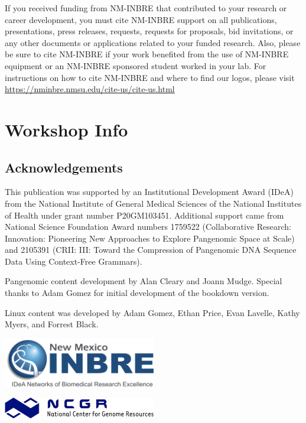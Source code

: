 \documentclass[
]{book}
\begin{document}
If you received funding from NM-INBRE that contributed to your research or career development, you must cite NM-INBRE support on all publications, presentations, press releases, requests, requests for proposals, bid invitations, or any other documents or applications related to your funded research. Also, please be sure to cite NM-INBRE if your work benefited from the use of NM-INBRE equipment or an NM-INBRE sponsored student worked in your lab.
For instructions on how to cite NM-INBRE and where to find our logos, please visit \url{https://nminbre.nmsu.edu/cite-us/cite-us.html}

\hypertarget{workshop-info}{%
\chapter{Workshop Info}\label{workshop-info}}

\hypertarget{acknowledgements}{%
\section{Acknowledgements}\label{acknowledgements}}

This publication was supported by an Institutional Development Award (IDeA) from the National Institute of General Medical Sciences of the National Institutes of Health under grant number P20GM103451. Additional support came from National Science Foundation Award numbers 1759522 (Collaborative Research: Innovation: Pioneering New Approaches to Explore Pangenomic Space at Scale) and 2105391 (CRII: III: Toward the Compression of Pangenomic DNA Sequence Data Using Context-Free Grammars).

Pangenomic content development by Alan Cleary and Joann Mudge. Special thanks to Adam Gomez for initial development of the bookdown version.

Linux content was developed by Adam Gomez, Ethan Price, Evan Lavelle, Kathy Myers, and Forrest Black.

\includegraphics[width=0.5\textwidth,height=\textheight]{./Figures/INBRE_Logo_Grad_transparent-2019.png}

\includegraphics[width=0.5\textwidth,height=\textheight]{./Figures/ncgr.png}
\end{document}
